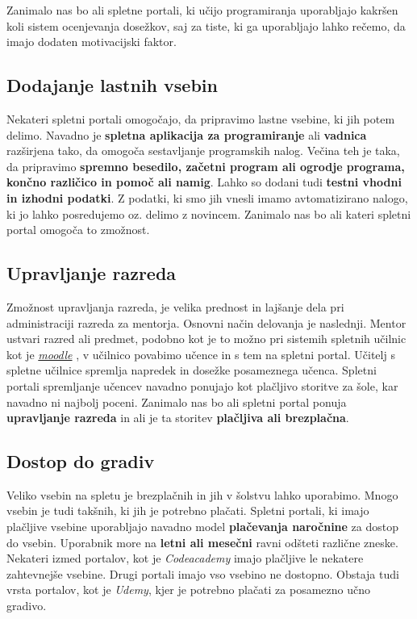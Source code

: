 Zanimalo nas bo ali spletne portali, ki učijo programiranja
uporabljajo kakršen koli sistem ocenjevanja dosežkov, saj za tiste, ki
ga uporabljajo lahko rečemo, da imajo dodaten motivacijski faktor.

\subsection{Dodajanje lastnih vsebin}
\label{sec:dodajanje_vsebin}

Nekateri spletni portali omogočajo, da pripravimo lastne vsebine, ki
jih potem delimo. Navadno je \textbf{spletna aplikacija za
  programiranje} ali \textbf{vadnica} razširjena tako, da omogoča
sestavljanje programskih nalog. Večina teh je taka, da pripravimo
\textbf{spremno besedilo, začetni program ali ogrodje programa, končno
  različico in pomoč ali namig}. Lahko so dodani tudi \textbf{testni
  vhodni in izhodni podatki}. Z podatki, ki smo jih vnesli imamo
avtomatizirano nalogo, ki jo lahko posredujemo oz. delimo z
novincem. Zanimalo nas bo ali kateri spletni portal omogoča to
zmožnost.

\subsection{Upravljanje razreda}
\label{sec:upravljanje_razreda}

Zmožnost upravljanja razreda, je velika prednost in lajšanje dela pri
administraciji razreda za mentorja. Osnovni način delovanja je
naslednji. Mentor ustvari razred ali predmet, podobno kot je to možno
pri sistemih spletnih učilnic kot je
\emph{\href{https://moodle.org/}{moodle}} \cite{web:moodle_site}, v
učilnico povabimo učence in s tem na spletni portal. Učitelj s spletne
učilnice spremlja napredek in dosežke posameznega učenca. Spletni
portali spremljanje učencev navadno ponujajo kot plačljivo storitve za
šole, kar navadno ni najbolj poceni. Zanimalo nas bo ali spletni
portal ponuja \textbf{upravljanje razreda} in ali je ta storitev
\textbf{plačljiva ali brezplačna}.

\subsection{Dostop do gradiv}
\label{sec:dostop_do_gradiv}

Veliko vsebin na spletu je brezplačnih in jih v šolstvu lahko
uporabimo. Mnogo vsebin je tudi takšnih, ki jih je potrebno
plačati. Spletni portali, ki imajo plačljive vsebine uporabljajo
navadno model \textbf{plačevanja naročnine} za dostop do
vsebin. Uporabnik more na \textbf{letni ali mesečni} ravni odšteti
različne zneske. Nekateri izmed portalov, kot je \emph{Codeacademy}
imajo plačljive le nekatere zahtevnejše vsebine. Drugi portali imajo
vso vsebino ne dostopno. Obstaja tudi vrsta portalov, kot je
\emph{Udemy}, kjer je potrebno plačati za posamezno učno gradivo.

